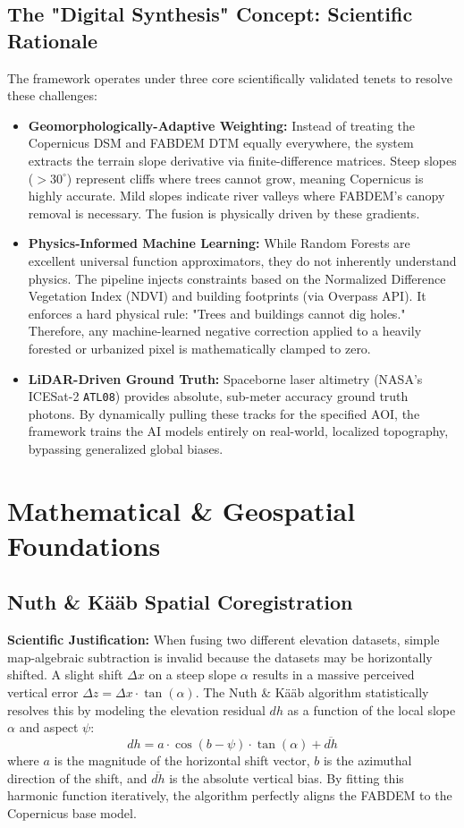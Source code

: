 \documentclass[11pt,a4paper,oneside]{report}
\begin{document}
\section{The "Digital Synthesis" Concept: Scientific Rationale}
The framework operates under three core scientifically validated tenets to resolve these challenges:
\begin{itemize}
    \item \textbf{Geomorphologically-Adaptive Weighting:} Instead of treating the Copernicus DSM and FABDEM DTM equally everywhere, the system extracts the terrain slope derivative via finite-difference matrices. Steep slopes ($>30^\circ$) represent cliffs where trees cannot grow, meaning Copernicus is highly accurate. Mild slopes indicate river valleys where FABDEM's canopy removal is necessary. The fusion is physically driven by these gradients.
    \item \textbf{Physics-Informed Machine Learning:} While Random Forests are excellent universal function approximators, they do not inherently understand physics. The pipeline injects constraints based on the Normalized Difference Vegetation Index (NDVI) and building footprints (via Overpass API). It enforces a hard physical rule: "Trees and buildings cannot dig holes." Therefore, any machine-learned negative correction applied to a heavily forested or urbanized pixel is mathematically clamped to zero.
    \item \textbf{LiDAR-Driven Ground Truth:} Spaceborne laser altimetry (NASA's ICESat-2 \texttt{ATL08}) provides absolute, sub-meter accuracy ground truth photons. By dynamically pulling these tracks for the specified AOI, the framework trains the AI models entirely on real-world, localized topography, bypassing generalized global biases.
\end{itemize}

\chapter{Mathematical \& Geospatial Foundations}

\section{Nuth \& K\"a\"ab Spatial Coregistration}
\textbf{Scientific Justification:} When fusing two different elevation datasets, simple map-algebraic subtraction is invalid because the datasets may be horizontally shifted. A slight shift $\Delta x$ on a steep slope $\alpha$ results in a massive perceived vertical error $\Delta z = \Delta x \cdot \tan(\alpha)$. The Nuth \& K\"a\"ab algorithm statistically resolves this by modeling the elevation residual $dh$ as a function of the local slope $\alpha$ and aspect $\psi$:
\begin{equation}
    dh = a \cdot \cos(b - \psi) \cdot \tan(\alpha) + \overline{dh}
\end{equation}
where $a$ is the magnitude of the horizontal shift vector, $b$ is the azimuthal direction of the shift, and $\overline{dh}$ is the absolute vertical bias. By fitting this harmonic function iteratively, the algorithm perfectly aligns the FABDEM to the Copernicus base model.
\end{document}
